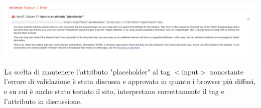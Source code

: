 	\includegraphics[width=35pc]{./img/erroreValidazione.png}
	
	La scelta di mantenere l'attributo "placeholder" al tag $<$input$>$ nonostante l'errore di validazione è stata discussa e approvata in quanto i browser più diffusi, e su cui è anche stato testato il sito, interpretano correttamente il tag e l'attributo in discussione.
\pagebreak